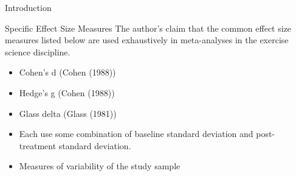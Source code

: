 \documentclass[
  ignorenonframetext,
  aspectratio=169,
]{beamer}
\begin{document}
\begin{frame}{Introduction}
\protect\hypertarget{introduction}{}
\begin{block}{Specific Effect Size Measures}
\protect\hypertarget{specific-effect-size-measures}{}
The author's claim that the common effect size measures listed below are
used exhaustively in meta-analyses in the exercise science discipline.

\begin{itemize}
\item
  Cohen's d (Cohen (1988))
\item
  Hedge's g (Cohen (1988))
\item
  Glass delta (Glass (1981))
\item
  Each use some combination of baseline standard deviation and
  post-treatment standard deviation.
\item
  Measures of variability of the study sample
\end{itemize}
\end{block}
\end{frame}
\end{document}
